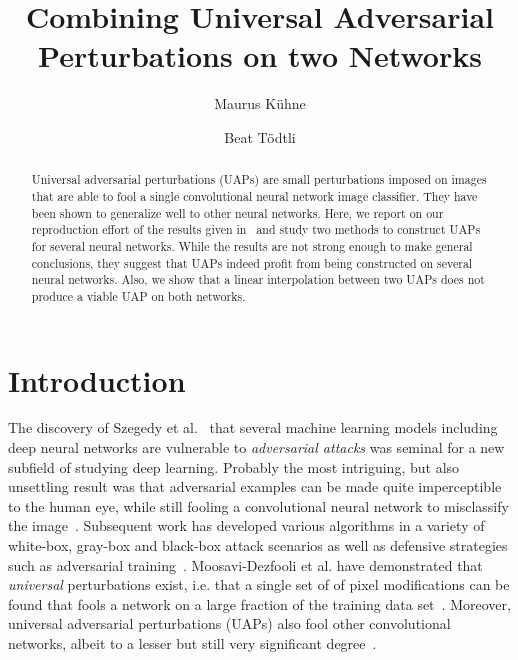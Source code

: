 \documentclass[runningheads]{llncs}
\begin{document}
%
\title{Combining Universal Adversarial Perturbations on two Networks}%
%
%
\author{Maurus K\"uhne \and
Beat Tödtli} %
%
%
%
\maketitle              %
%
\begin{abstract}
Universal adversarial perturbations (UAPs) are small perturbations imposed on images that are able to fool a single convolutional neural network image classifier. They have been shown to generalize well to other neural networks. Here, we report on our reproduction effort of the results given in~\cite{moosavi-dezfooli_universal_2017} and study two methods to construct UAPs for several neural networks. While the results are not strong enough to make general conclusions, they suggest that UAPs indeed profit from being constructed on several neural networks. Also, we show that a linear interpolation between two UAPs does not produce a viable UAP on both networks.
\end{abstract}
%
%
%

\section{Introduction}
The discovery of Szegedy et al.~\cite{Szegedy_2014} that several machine learning models including deep neural networks are vulnerable to \emph{adversarial attacks} was seminal for a new subfield of studying deep learning. Probably the most intriguing, but also unsettling result was that adversarial examples can be made quite imperceptible to the human eye, while still fooling a convolutional neural network to misclassify the image~\cite{goodfellow_2014}. Subsequent work has developed various algorithms in a variety of white-box, gray-box and black-box attack scenarios as well as defensive strategies such as adversarial training~\cite{REN2020346}. Moosavi-Dezfooli et al. have demonstrated that \emph{universal} perturbations exist, i.e. that a single set of of pixel modifications can be found that fools a network on a large fraction of the training data set~\cite{moosavidezfooli_universal_2017}. Moreover, universal adversarial perturbations (UAPs) also fool other convolutional networks, albeit to a lesser but still very significant degree~\cite{moosavidezfooli_universal_2017}. 
\end{document}
